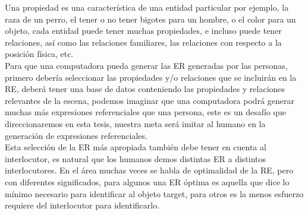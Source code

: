 Una propiedad es una caracter\'istica de una entidad particular por ejemplo, la raza de un perro, el tener o no tener bigotes para un hombre, o el color para un objeto, cada entidad puede tener muchas propiedades, e incluso puede tener relaciones, as\'i como las relaciones familiares, las relaciones con respecto a la posici\'on f\'isica, etc.\\

 Para que una computadora pueda generar las ER generadas por las personas, primero deber\'ia seleccionar las propiedades y/o relaciones que se incluir\'an en la RE, deber\'a tener una base de datos conteniendo las propiedades y relaciones relevantes de la escena, podemos imaginar que una computadora podr\'a generar muchas m\'as expresiones referenciales que una persona, este es un desaf\'io que direccionaremos en esta tesis, nuestra meta ser\'a imitar al humano en la generaci\'on de expresiones referenciales. \\

Esta selecci\'on de la ER m\'as apropiada tambi\'en debe tener en cuenta al interlocutor, es natural que los humanos demos distintas ER a distintos interlocutores. En el \'area muchas veces se habla de optimalidad de la RE, pero con diferentes significados, para algunos una ER \'optima es aquella que dice lo m\'inimo necesario para identificar al objeto target, para otros es la menos esfuerzo requiere del interlocutor para identificarlo.

